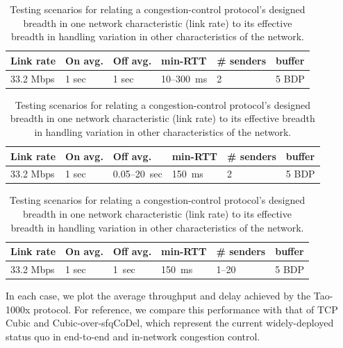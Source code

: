 \begin{table}

\begin{subtable}{\columnwidth}
\small
\begin{tabular}{l|l|l|l|l|l}
\bf Link rate & \bf On avg. & \bf Off avg. & \bf min-RTT & \bf \#
senders & \bf buffer \\
\hline
33.2 Mbps & 1 sec & 1 sec & \cellcolor{blue!20} 10--300~ms & 2 & 5 BDP \\
\end{tabular}
\caption{Testing scenarios for measuring breadth in delay.}
\label{table:p-training}
\end{subtable}

\vspace{\baselineskip}

\begin{subtable}{\columnwidth}
\small
\begin{tabular}{l|l|l|l|l|l}
\bf Link rate & \bf On avg. & \bf Off avg. & \bf min-RTT & \bf \#
senders & \bf buffer \\
\hline
33.2 Mbps & 1 sec & \cellcolor{blue!20} 0.05--20~sec & 150~ms & 2 & 5 BDP \\
\end{tabular}
\caption{\ldots for measuring breadth in link rate.}
\end{subtable}

\vspace{\baselineskip}

\begin{subtable}{\columnwidth}
\small
\begin{tabular}{l|l|l|l|l|l}
\bf Link rate & \bf On avg. & \bf Off avg. & \bf min-RTT & \bf \#
senders & \bf buffer \\
\hline
33.2 Mbps & 1 sec & 1~sec & 150~ms & \cellcolor{blue!20} 1--20 & 5 BDP \\
\end{tabular}
\caption{\ldots for measuring breadth in the degree of multiplexing.}
\end{subtable}

\caption{Testing scenarios for relating a congestion-control
  protocol's designed breadth in one network characteristic (link rate)
  to its effective breadth in handling variation in other
  characteristics of the network.}
\label{table:p-learnability}

\end{table}

In each case, we plot the average throughput and delay achieved by the
Tao-1000x protocol. For reference, we compare this performance with
that of TCP Cubic and Cubic-over-sfqCoDel, which represent the current
widely-deployed status quo in end-to-end and in-network congestion
control.

